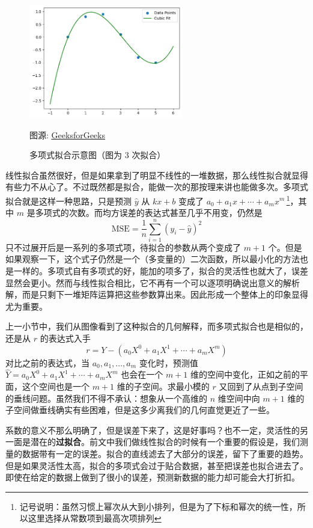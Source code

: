 \documentclass[UTF8, 12pt]{article}
\newcommand{\uhref}[2]{\href{#1}{\underline{#2}}}
\begin{document}
\begin{figure}[H]
    \centering
    \includegraphics[width=0.6\textwidth]{png/polynomial_fitting.png}
    \caption{多项式拟合示意图（图为 3 次拟合）}
    {图源: \uhref{https://www.geeksforgeeks.org/numpys-polyfit-function-a-comprehensive-guide/}{GeeksforGeeks}}
    \label{fig:polynomial_fitting}
\end{figure}

线性拟合虽然很好，但是如果拿到了明显不线性的一堆数据，那么线性拟合就显得有些力不从心了。不过既然都是拟合，能做一次的那按理来讲也能做多次。多项式拟合就是这样一种思路，只是预测 $\hat y$ 从 $kx+b$ 变成了 $a_0 + a_1 x + \cdots + a_m x^m$\,\footnote{记号说明：虽然习惯上幂次从大到小排列，但是为了下标和幂次的统一性，所以这里选择从常数项到最高次项排列}，其中 $m$ 是多项式的次数。而均方误差的表达式甚至几乎不用变，仍然是
\[
    \text{MSE} = \frac1n \sum_{i=1}^n (y_i - \hat y)^2
\]
只不过展开后是一系列的多项式项，待拟合的参数从两个变成了 $m+1$ 个。但是如果观察一下，这个式子仍然是一个（多变量的）二次函数，所以最小化的方法也是一样的。多项式自有多项式的好，能加的项多了，拟合的灵活性也就大了，误差显然会更小。然而与线性拟合相比，它不再有一个可以逐项明确说出意义的解析解，而是只剩下一堆矩阵运算把这些参数算出来。因此形成一个整体上的印象显得尤为重要。

上一小节中，我们从图像看到了这种拟合的几何解释，而多项式拟合也是相似的，还是从 $r$ 的表达式入手
\[
    r = Y - (a_0 X^0 + a_1 X^1 + \cdots + a_m X^m)
\]
对比之前的表达式，当 $a_0, a_1, \ldots, a_m$ 变化时，预测值 $\hat Y = a_0 X^0 + a_1 X^1 + \cdots + a_m X^m$ 也会在一个 $m + 1$ 维的空间中变化，正如之前的平面，这个空间也是一个 $m + 1$ 维的子空间。求最小模的 $r$ 又回到了从点到子空间的垂线问题。虽然我们不得不承认：想象从一个高维的 $n$ 维空间中向 $m+1$ 维的子空间做垂线确实有些困难，但是这多少离我们的几何直觉更近了一些。

系数的意义不那么明确了，但是误差下来了，这是好事吗？也不一定，灵活性的另一面是潜在的\textbf{过拟合}。前文中我们做线性拟合的时候有一个重要的假设是，我们测量的数据带有一定的误差。拟合的直线滤去了大部分的误差，留下了重要的趋势。但是如果灵活性太高，拟合的多项式会过于贴合数据，甚至把误差也拟合进去了。即使在给定的数据上做到了很小的误差，预测新数据的能力却可能会大打折扣。
\end{document}
